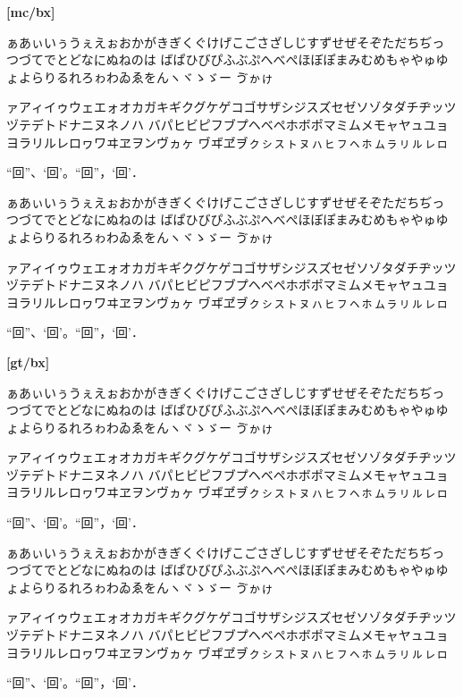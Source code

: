 \documentclass[a4paper,titlepage, draft]{\class}
\begin{document}
{\bfseries%
[mc/bx]

ぁあぃいぅうぇえぉおかがきぎくぐけげこごさざしじすずせぜそぞただちぢっつづてでとどなにぬねのは
ばぱひびぴふぶぷへべぺほぼぽまみむめもゃやゅゆょよらりるれろゎわゐゑをんヽヾゝゞー
\ifuptexmode
ゔゕゖ
\fi

ァアィイゥウェエォオカガキギクグケゲコゴサザシジスズセゼソゾタダチヂッツヅテデトドナニヌネノハ
バパヒビピフブプヘベペホボポマミムメモャヤュユョヨラリルレロヮワヰヱヲンヴヵヶ
\ifuptexmode
ヷヸヹヺㇰㇱㇲㇳㇴㇵㇶㇷㇸㇹㇺㇻㇼㇽㇾㇿ
\fi

“回”、‘回’。“回”，‘回’．
}

{\gtfamily
[gt/m]

ぁあぃいぅうぇえぉおかがきぎくぐけげこごさざしじすずせぜそぞただちぢっつづてでとどなにぬねのは
ばぱひびぴふぶぷへべぺほぼぽまみむめもゃやゅゆょよらりるれろゎわゐゑをんヽヾゝゞー
\ifuptexmode
ゔゕゖ
\fi

ァアィイゥウェエォオカガキギクグケゲコゴサザシジスズセゼソゾタダチヂッツヅテデトドナニヌネノハ
バパヒビピフブプヘベペホボポマミムメモャヤュユョヨラリルレロヮワヰヱヲンヴヵヶ
\ifuptexmode
ヷヸヹヺㇰㇱㇲㇳㇴㇵㇶㇷㇸㇹㇺㇻㇼㇽㇾㇿ
\fi

“回”、‘回’。“回”，‘回’．

{\bfseries%
[gt/bx]

ぁあぃいぅうぇえぉおかがきぎくぐけげこごさざしじすずせぜそぞただちぢっつづてでとどなにぬねのは
ばぱひびぴふぶぷへべぺほぼぽまみむめもゃやゅゆょよらりるれろゎわゐゑをんヽヾゝゞー
\ifuptexmode
ゔゕゖ
\fi

ァアィイゥウェエォオカガキギクグケゲコゴサザシジスズセゼソゾタダチヂッツヅテデトドナニヌネノハ
バパヒビピフブプヘベペホボポマミムメモャヤュユョヨラリルレロヮワヰヱヲンヴヵヶ
\ifuptexmode
ヷヸヹヺㇰㇱㇲㇳㇴㇵㇶㇷㇸㇹㇺㇻㇼㇽㇾㇿ
\fi

“回”、‘回’。“回”，‘回’．
}}

{\mgfamily
[mg/m]

ぁあぃいぅうぇえぉおかがきぎくぐけげこごさざしじすずせぜそぞただちぢっつづてでとどなにぬねのは
ばぱひびぴふぶぷへべぺほぼぽまみむめもゃやゅゆょよらりるれろゎわゐゑをんヽヾゝゞー
\ifuptexmode
ゔゕゖ
\fi

ァアィイゥウェエォオカガキギクグケゲコゴサザシジスズセゼソゾタダチヂッツヅテデトドナニヌネノハ
バパヒビピフブプヘベペホボポマミムメモャヤュユョヨラリルレロヮワヰヱヲンヴヵヶ
\ifuptexmode
ヷヸヹヺㇰㇱㇲㇳㇴㇵㇶㇷㇸㇹㇺㇻㇼㇽㇾㇿ
\fi

“回”、‘回’。“回”，‘回’．
}
\end{document}
